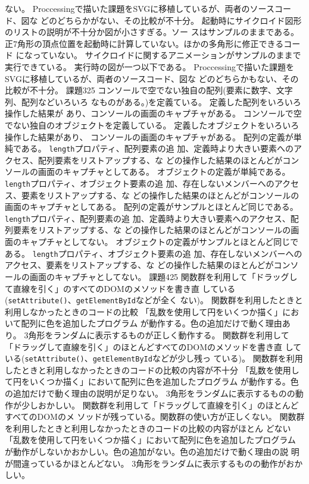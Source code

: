 \documentclass[a4j]{jreport}
\begin{document}
{{{	ない。\ResultA}
	{Proccessingで描いた課題をSVGに移植しているが、両者のソースコード、図な
	どのどちらかがない、その比較が不十分。\ResultA}
 }
 {
  {起動時にサイクロイド図形のリストの説明が不十分か図が小さすぎる。ソー
	スはサンプルのままである。\ResultA}
  {正7角形の頂点位置を起動時に計算していない。ほかの多角形に修正できるコード
	になっていない。\ResultA}
	{サイクロイドに関するアニメーションがサンプルのままで実行できている。
	実行時の図が一つ以下である。\ResultA}
	{Proccessingで描いた課題をSVGに移植しているが、両者のソースコード、図な
	どのどちらかもない、その比較が不十分。\ResultA}
 }
 {課題3}{25}
 {
   {コンソールで空でない独自の配列(要素に数字、文字列、配列などいろいろ
	 なものがある。)を定義ている。\ResultEI}
	 {定義した配列をいろいろ操作した結果が
	 あり、コンソールの画面のキャプチャがある。\ResultFI}
   {コンソールで空でない独自のオブジェクトを定義している。\ResultEI}
	 {定義したオブジェクトをいろいろ操作した結果があり、
	 コンソールの画面のキャプチャがある。\ResultFI}
 }
 {
   {配列の定義が単純である。\ResultEI}
	 {\texttt{length}プロパティ、配列要素の追
	 加、定義時より大きい要素へのアクセス、配列要素をリストアップする、な
	 どの操作した結果のほとんどがコンソールの画面のキャプチャとしてある。\ResultFI}
   {オブジェクトの定義が単純である。\ResultEI}
	 {\texttt{length}プロパティ、オブジェクト要素の追
	 加、存在しないメンバーへのアクセス、要素をリストアップする、な
	 どの操作した結果のほとんどがコンソールの画面のキャプチャとしてある。\ResultFI}
 }
 {
   {配列の定義がサンプルとほとんど同じである。\ResultEI}
	 {\texttt{length}プロパティ、配列要素の追
	 加、定義時より大きい要素へのアクセス、配列要素をリストアップする、な
	 どの操作した結果のほとんどがコンソールの画面のキャプチャとしてない。\ResultFI}
   {オブジェクトの定義がサンプルとほとんど同じである。\ResultEI}
	 {\texttt{length}プロパティ、オブジェクト要素の追
	 加、存在しないメンバーへのアクセス、要素をリストアップする、な
	 どの操作した結果のほとんどがコンソールの画面のキャプチャとしてない。\ResultFI}
 }
 {課題4}{25}
 {
   {関数群を利用して「ドラッグして直線を引く」のすべてのDOMのメソッドを書き直
	 している(\texttt{setAttribute()}、\texttt{getElementById}などが全く
	 ない)。\ResultA}
	 {関数群を利用したときと利用しなかったときのコードの比較\ResultFI}
	 {「乱数を使用して円をいくつか描く」において配列に色を追加したプログラム
 	 が動作する。色の追加だけで動く理由あり。\ResultA}
	 {3角形をランダムに表示するものが正しく動作する。\ResultA}
 }
 {
   {関数群を利用して「ドラッグして直線を引く」のほとんどすべてのDOMのメソッドを書き直
	 している(\texttt{setAttribute()}、\texttt{getElementById}などが少し残っ
	 ている)。\ResultA}
	 {関数群を利用したときと利用しなかったときのコードの比較の内容が不十分\ResultFI}
	 {「乱数を使用して円をいくつか描く」において配列に色を追加したプログラム
 	 が動作する。色の追加だけで動く理由の説明が足りない。\ResultA}
	 {3角形をランダムに表示するものの動作が少しおかしい。\ResultA}
 }
 {
   {関数群を利用して「ドラッグして直線を引く」のほとんどすべてのDOMのメ
	 ソッドが残っている。関数群の使い方が正しくない。\ResultA}
	 {関数群を利用したときと利用しなかったときのコードの比較の内容がほとん
	 どない\ResultFI}
	 {「乱数を使用して円をいくつか描く」において配列に色を追加したプログラム
 	 が動作がしないかおかしい。色の追加がない。色の追加だけで動く理由の説
	 明が間違っているかほとんどない。\ResultA}
	 {3角形をランダムに表示するものの動作がおかしい。\ResultA}
 }
}
\end{document}
